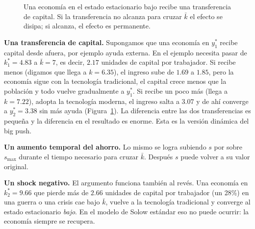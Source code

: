 \documentclass[12pt,letterpaper]{article}
\newcommand{\palfa}{0.3333}  %
\newcommand{\pAdos}{2}       %
\begin{document}
\begin{figure}[htb]
\centering
{}
\caption{Una economía en el estado estacionario bajo recibe una transferencia de capital. Si la transferencia no alcanza para cruzar $\bar k$ el efecto se disipa; si alcanza, el efecto es permanente.}
\label{fig:tray}
\end{figure}

\textbf{Una transferencia de capital.} Supongamos que una economía en $y_1^*$ recibe capital desde afuera, por ejemplo ayuda externa. En el ejemplo necesita pasar de $k_1^*=4.83$ a $\bar k=7$, es decir, $2.17$ unidades de capital por trabajador. Si recibe menos (digamos que llega a $k=6.35$), el ingreso sube de $1.69$ a $1.85$, pero la economía sigue con la tecnología tradicional, el capital crece menos que la población y todo vuelve gradualmente a $y_1^*$. Si recibe un poco más (llega a $k=7.22$), adopta la tecnología moderna, el ingreso salta a $3.07$ y de ahí converge a $y_2^*=3.38$ sin más ayuda (Figura~\ref{fig:tray}). La diferencia entre las dos transferencias es pequeña y la diferencia en el resultado es enorme. Esta es la versión dinámica del big push.

\textbf{Un aumento temporal del ahorro.} Lo mismo se logra subiendo $s$ por sobre $s_{\max}$ durante el tiempo necesario para cruzar $\bar k$. Después $s$ puede volver a su valor original.

\textbf{Un shock negativo.} El argumento funciona también al revés. Una economía en $k_2^*=9.66$ que pierde más de $2.66$ unidades de capital por trabajador (un 28\%) en una guerra o una crisis cae bajo $\bar k$, vuelve a la tecnología tradicional y converge al estado estacionario \emph{bajo}. En el modelo de Solow estándar eso no puede ocurrir: la economía siempre se recupera.
\end{document}
